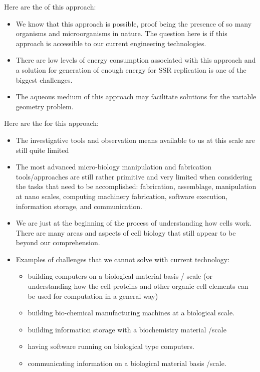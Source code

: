 Here are the  of this approach:

\begin{itemize}
\item We know that this approach is possible, proof being the presence
of so many organisms and microorganisms in nature. The question here is
if this approach is accessible to our current engineering technologies.
\item There are low levels of energy consumption associated with this
approach and a solution for generation of enough energy for SSR
replication is one of the biggest challenges.
\item The aqueous medium of this approach may facilitate solutions for
the variable geometry problem.
\end{itemize}

Here are the  for this approach:

\begin{itemize}
\item The investigative tools and observation means available to us at
this scale are still quite limited
\item The most advanced micro-biology manipulation and fabrication
tools/approaches are still rather primitive and very limited when
considering the tasks that need to be accomplished: fabrication,
assemblage, manipulation at nano scales, computing machinery
fabrication, software execution, information storage, and communication.
\item We are just at the beginning of the process of understanding how
cells work. There are many areas and aspects of cell biology that still
appear to be beyond our comprehension.
\item Examples of challenges that we cannot solve with current
technology: 

\begin{itemize}
\item building computers on a biological material basis / scale (or
understanding how the cell proteins and other organic cell elements can
be used for computation in a general way)
\item building bio-chemical manufacturing machines at a biological
scale.
\item building information storage with a biochemistry material /scale
\item having software running on biological type computers.
\item communicating information on a biological material basis /scale.
\end{itemize}
\end{itemize}

